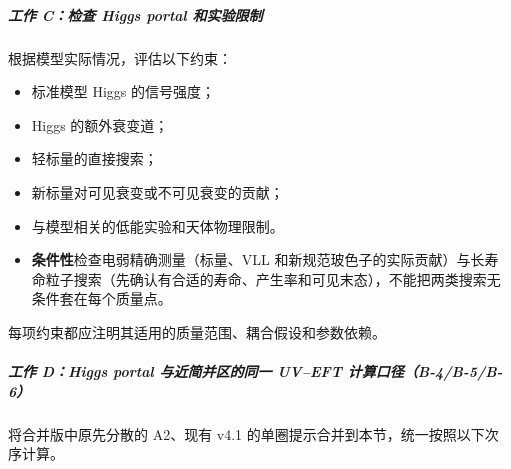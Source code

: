 \documentclass[
  chinese,
  UTF8]{ctexart}
\begin{document}
\subparagraph{工作 C：检查 Higgs portal
和实验限制}\label{ux5de5ux4f5c-cux68c0ux67e5-higgs-portal-ux548cux5b9eux9a8cux9650ux5236}

根据模型实际情况，评估以下约束：

\begin{itemize}
\item
  标准模型 Higgs 的信号强度；
\item
  Higgs 的额外衰变道；
\item
  轻标量的直接搜索；
\item
  新标量对可见衰变或不可见衰变的贡献；
\item
  与模型相关的低能实验和天体物理限制。
\item
  \textbf{条件性}检查电弱精确测量（标量、VLL
  和新规范玻色子的实际贡献）与长寿命粒子搜索（先确认有合适的寿命、产生率和可见末态），不能把两类搜索无条件套在每个质量点。
\end{itemize}

每项约束都应注明其适用的质量范围、耦合假设和参数依赖。

\subparagraph{工作 D：Higgs portal 与近简并区的同一 UV--EFT
计算口径（B-4/B-5/B-6）}\label{ux5de5ux4f5c-dhiggs-portal-ux4e0eux8fd1ux7b80ux5e76ux533aux7684ux540cux4e00-uveft-ux8ba1ux7b97ux53e3ux5f84b-4b-5b-6}

将合并版中原先分散的 A2、现有 v4.1
的单圈提示合并到本节，统一按照以下次序计算。
\end{document}
